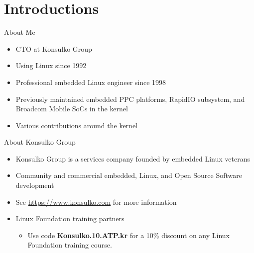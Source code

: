 \section{Introductions}

\begin{frame}
	{About Me}

	\begin{itemize}
		\item
			CTO at Konsulko Group
		\item
			Using Linux since 1992
		\item
			Professional embedded Linux engineer since 1998
		\item
			Previously maintained embedded PPC platforms, RapidIO subsystem, and Broadcom Mobile SoCs in the kernel
		\item
			Various contributions around the kernel
	\end{itemize}

\end{frame}


\begin{frame}
	{About Konsulko Group}
	\begin{itemize}
		\item
			Konsulko Group is a services company founded by embedded Linux veterans
		\item
			Community and commercial embedded, Linux, and Open Source Software development
		\item
			See \url{https://www.konsulko.com} for more information
		\item
			Linux Foundation training partners
			\begin{itemize}
				\item
					Use code \textbf{Konsulko.10.ATP.kr} for a 10\% discount on any Linux Foundation training course.
			\end{itemize}
	\end{itemize}
\end{frame}
